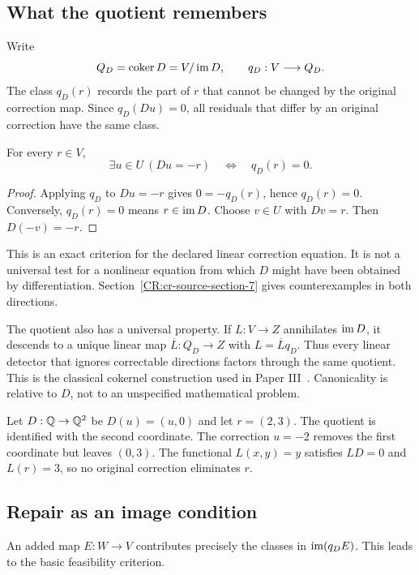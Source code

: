 \subsection{What the quotient remembers}
Write
\[
Q_D=\operatorname{coker} D=V/\operatorname{im} D,\qquad q_D:V\longrightarrow Q_D.
\]
The class $q_D(r)$ records the part of $r$ that cannot be changed by the original correction map. Since $q_D(Du)=0$, all residuals that differ by an original correction have the same class.

\begin{CRtheorem}\label{CR:thm:correctable}
For every $r\in V$,
\[
\exists u\in U\ (Du=-r)\quad\Longleftrightarrow\quad q_D(r)=0.
\]
\end{CRtheorem}
\begin{proof}
Applying $q_D$ to $Du=-r$ gives $0=-q_D(r)$, hence $q_D(r)=0$. Conversely, $q_D(r)=0$ means $r\in\operatorname{im} D$. Choose $v\in U$ with $Dv=r$. Then $D(-v)=-r$.
\end{proof}

This is an exact criterion for the declared linear correction equation. It is not a universal test for a nonlinear equation from which $D$ might have been obtained by differentiation. Section~\ref{CR:cr-source-section-7} gives counterexamples in both directions.

The quotient also has a universal property. If $L:V\to Z$ annihilates $\operatorname{im} D$, it descends to a unique linear map $\overline L:Q_D\to Z$ with $L=\overline Lq_D$. Thus every linear detector that ignores correctable directions factors through the same quotient. This is the classical cokernel construction used in Paper III~\cite{CR:paperiii}. Canonicality is relative to $D$, not to an unspecified mathematical problem.

\begin{CRexample}\label{CR:ex:plane}
Let $D:\mathbb{Q}\to\mathbb{Q}^2$ be $D(u)=(u,0)$ and let $r=(2,3)$. The quotient is identified with the second coordinate. The correction $u=-2$ removes the first coordinate but leaves $(0,3)$. The functional $L(x,y)=y$ satisfies $LD=0$ and $L(r)=3$, so no original correction eliminates $r$.
\end{CRexample}

\subsection{Repair as an image condition}
An added map $E:W\to V$ contributes precisely the classes in $\operatorname{im}(q_DE)$. This leads to the basic feasibility criterion.

